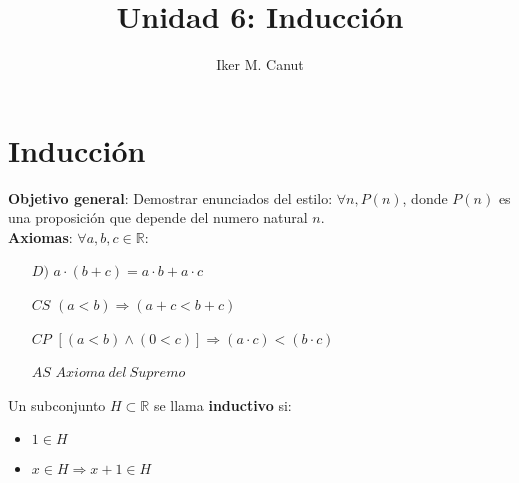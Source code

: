 \documentclass[11pt,a4paper]{article}
\author{Iker M. Canut}
\title{Unidad 6: Inducci\'on}
\begin{document}
\maketitle
\newpage
\section{Inducci\'on}
\textbf{Objetivo general}: Demostrar enunciados del estilo: $\forall n, P(n)$, donde $P(n)$ es una proposici\'on que depende del numero natural $n$.\\

\textbf{Axiomas}: $\forall a,b,c \in \mathbb{R}$:
\begin{enumerate}
\item [$D)$] $a \cdot (b + c) = a \cdot b + a \cdot c$
\item [$CS$] $(a < b) \Rightarrow (a+c < b+c)$
\item [$CP$] $[(a < b) \land (0 < c)] \Rightarrow (a \cdot c) < (b \cdot c)$
\item [$AS$] $Axioma\ del\ Supremo$
\end{enumerate}

\noindent \dotfill

Un subconjunto $H \subset \mathbb{R}$ se llama \textbf{inductivo} si:
\begin{itemize}
\item $1 \in H$
\item $x \in H \Rightarrow x+1 \in H$
\end{itemize}
\end{document}
